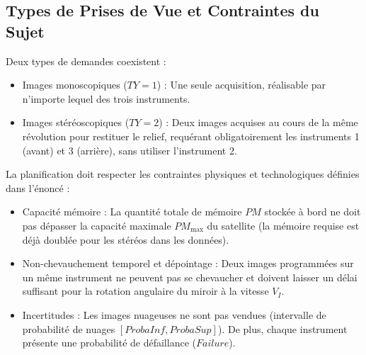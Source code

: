 \subsection{Types de Prises de Vue et Contraintes du Sujet}
Deux types de demandes coexistent :
\begin{itemize}
    \item Images monoscopiques ($TY=1$) : Une seule acquisition, réalisable par n'importe lequel des trois instruments.
    \item Images stéréoscopiques ($TY=2$) : Deux images acquises au cours de la même révolution pour restituer le relief, requérant obligatoirement les instruments 1 (avant) et 3 (arrière), sans utiliser l'instrument 2.
\end{itemize}

La planification doit respecter les contraintes physiques et technologiques définies dans l'énoncé :
\begin{itemize}
    \item Capacité mémoire : La quantité totale de mémoire $PM$ stockée à bord ne doit pas dépasser la capacité maximale $PM_{\max}$ du satellite (la mémoire requise est déjà doublée pour les stéréos dans les données).
    \item Non-chevauchement temporel et dépointage : Deux images programmées sur un même instrument ne peuvent pas se chevaucher et doivent laisser un délai suffisant pour la rotation angulaire du miroir à la vitesse $V_I$.
    \item Incertitudes : Les images nuageuses ne sont pas vendues (intervalle de probabilité de nuages $[ProbaInf, ProbaSup]$). De plus, chaque instrument présente une probabilité de défaillance ($Failure$).
\end{itemize}
